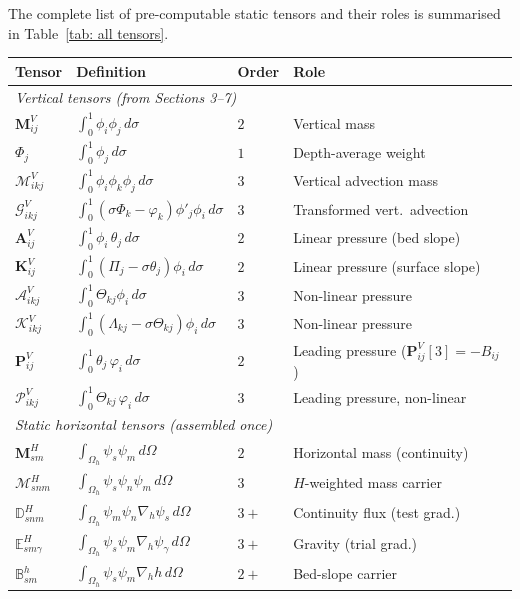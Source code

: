 \documentclass{article}
\newcommand{\nablah}{\nabla_h}
\newcommand{\VMij}{\mathbf{M}_{ij}^V}
\newcommand{\VAij}{\mathbf{A}_{ij}^V}
\newcommand{\VKij}{\mathbf{K}_{ij}^V}
\newcommand{\VMikj}{\boldsymbol{\mathcal{M}}_{ikj}^V}
\newcommand{\VGikj}{\boldsymbol{\mathcal{G}}_{ikj}^V}
\newcommand{\VAikj}{\boldsymbol{\mathcal{A}}_{ikj}^V}
\newcommand{\VKikj}{\boldsymbol{\mathcal{K}}_{ikj}^V}
\newcommand{\VPij}{\mathbf{P}_{ij}^V}
\newcommand{\VPikj}{\boldsymbol{\mathcal{P}}_{ikj}^V}
\newcommand{\HMsm}{\mathbf{M}_{sm}^H}
\newcommand{\HMsnm}{\boldsymbol{\mathcal{M}}_{snm}^H}
\newcommand{\HDsnma}{\mathbb{D}_{snm}^H}
\begin{document}
The complete list of pre-computable static tensors and their roles is summarised in Table~\ref{tab: all tensors}.
 
\begin{table}[H]
\centering
\renewcommand{\arraystretch}{1.45}
\begin{tabular}{llll}
\toprule
Tensor & Definition & Order & Role \\
\midrule
\multicolumn{4}{l}{\textit{Vertical tensors (from Sections 3--7)}}\\
$\VMij$ & $\int_0^1\phi_i\phi_j\,d\sigma$ & $2$ & Vertical mass \\
$\Phi_j$ & $\int_0^1\phi_j\,d\sigma$ & $1$ & Depth-average weight \\
$\VMikj$ & $\int_0^1\phi_i\phi_k\phi_j\,d\sigma$ & $3$ & Vertical advection mass \\
$\VGikj$ & $\int_0^1(\sigma\Phi_k-\varphi_k)\phi'_j\phi_i\,d\sigma$ & $3$ & Transformed vert.\ advection \\
$\VAij$ & $\int_0^1\phi_i\,\theta_j\,d\sigma$ & $2$ & Linear pressure (bed slope) \\
$\VKij$ & $\int_0^1(\Pi_j-\sigma\theta_j)\phi_i\,d\sigma$ & $2$ & Linear pressure (surface slope) \\
$\VAikj$ & $\int_0^1\Theta_{kj}\phi_i\,d\sigma$ & $3$ & Non-linear pressure \\
$\VKikj$ & $\int_0^1(\Lambda_{kj}-\sigma\Theta_{kj})\phi_i\,d\sigma$ & $3$ & Non-linear pressure \\
$\VPij$ & $\int_0^1\theta_j\,\varphi_i\,d\sigma$ & $2$ & Leading pressure ($\VPij[3]=-B_{ij}$) \\
$\VPikj$ & $\int_0^1\Theta_{kj}\,\varphi_i\,d\sigma$ & $3$ & Leading pressure, non-linear \\
\midrule
\multicolumn{4}{l}{\textit{Static horizontal tensors (assembled once)}}\\
$\HMsm$ & $\int_{\Omega_h}\psi_s\psi_m\,d\Omega$ & $2$ & Horizontal mass (continuity) \\
$\HMsnm$ & $\int_{\Omega_h}\psi_s\psi_n\psi_m\,d\Omega$ & $3$ & $H$-weighted mass carrier \\
$\HDsnma$ & $\int_{\Omega_h}\psi_m\psi_n\nablah\psi_s\,d\Omega$ & $3{+}$ & Continuity flux (test grad.) \\
$\mathbb{E}^H_{sm\gamma}$ & $\int_{\Omega_h}\psi_s\psi_m\nablah\psi_\gamma\,d\Omega$ & $3{+}$ & Gravity (trial grad.) \\
$\mathbb{B}^h_{sm}$ & $\int_{\Omega_h}\psi_s\psi_m\nablah h\,d\Omega$ & $2{+}$ & Bed-slope carrier \\

\end{tabular}
\end{table}
\end{document}

